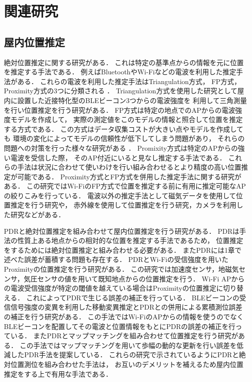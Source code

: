 


\chapter{関連研究}


\section{屋内位置推定}

絶対位置推定に関する研究がある．
これは特定の基準点からの情報を元に位置を推定する手法である．
例えばBluetoothやWi-Fiなどの電波を利用した推定手法がある．
これらの電波を利用した推定手法はTriangulation方式，
FP方式，Proximity方式の3つに分類される
\cite{wireless-lan-summary}．
Triangulation方式を使用した研究として屋内に設置した近接特化型のBLEビーコン3つからの電波強度を
利用して三角測量を行い位置推定を行う研究がある\cite{ble-indoor}\cite{ble-tandem}\cite{triangulation-kalman}．
FP方式は特定の地点でのAPからの電波強度モデルを作成して，
実際の測定値をこのモデルの情報と照合して位置を推定する方式である．
この方式はデータ収集コストが大きい点やモデルを作成しても
環境の変化によってモデルの信頼性が低下してしまう問題があり，
それらの問題への対策を行った様々な研究がある
\cite{gaussian-mixture-model}
\cite{wireless-lan-cost-reduction}
\cite{fingerprint-auto-update}
\cite{wi-fi-fingerprint-domain}．
Promixity方式は特定のAPからの強い電波を受信した際，
そのAP付近にいると見なし推定する手法である．
これらの手法は状況に合わせて使いわけを行い組み合わせるとより精度の高い位置推定が可能である．
Proximity方式とFP方式を併用した推定手法に関する研究がある\cite{proximity-fingerprint}．
この研究ではWi-FiのFP方式で位置を推定する前に有用に推定可能なAPの絞りこみを行っている．
電波以外の推定手法として磁気データを使用して位置推定を行う研究\cite{pdr-mag}や，
赤外線を使用して位置推定を行う研究\cite{infrared}，カメラを利用した研究\cite{camera}などがある．

PDRと絶対位置推定を組み合わせて屋内位置推定を行う研究がある．
PDRは手法の性質上ある地点からの相対的な位置を推定する手法であるため，
位置推定をするためには絶対位置推定と組み合わせる必要がある．
またPDRには1章で述べた誤差が蓄積する問題も存在する．
PDRとWi-Fiの受信強度を用いたProximityの位置推定を行う研究\cite{pdr-wifi}がある．
この研究では加速度センサ，地磁気センサ，気圧センサの値を用いて既知地点からの位置推定を行う．
Wi-Fi APからの電波受信強度が特定の閾値を越えている場合はProximityの位置推定に切り替える．
これによってPDRで生じる誤差の補正を行っている．
BLEビーコンの受信信号強度の変異を利用した移動変異推定とPDRとの併用による累積測位誤差の補正を行う研究\cite{pdr-ble}がある．
この手法ではWi-FiのAPからの情報を使うのでなくBLEビーコンを配置してその電波と位置情報をもとにPDRの誤差の補正を行っている．
またPDRとマップマッチングを組み合わせて位置推定を行う研究\cite{pdr-map}がある．
この手法ではマップマッチングを用いて歩幅の動的な更新を行い誤差を低減したPDR手法を提案している．
これらの研究で示されているようにPDRと絶対位置測位を組み合わせた手法は，
お互いのデメリットを補えるため屋内位置推定をする上で有用な手法である．

